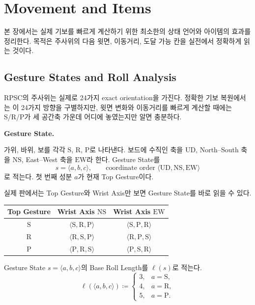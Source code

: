 \chapter{Movement and Items}

본 장에서는 실제 기보를 빠르게 계산하기 위한 최소한의 상태 언어와 아이템의 효과를 정리한다. 목적은 주사위의 다음 윗면, 이동거리, 도달 가능 칸을 실전에서 정확하게 읽는 것이다.

\section{Gesture States and Roll Analysis}

RPSC의 주사위는 실제로 24가지 exact orientation을 가진다. 정확한 기보 복원에서는 이 24가지 방향을 구별하지만, 윗면 변화와 이동거리를 빠르게 계산할 때에는 S/R/P가 세 공간축 가운데 어디에 놓였는지만 알면 충분하다.

\medskip
\noindent\textbf{Gesture State.}

가위, 바위, 보를 각각 $\mathrm{S}$, $\mathrm{R}$, $\mathrm{P}$로 나타낸다. 보드에 수직인 축을 $\mathrm{UD}$, North--South 축을 $\mathrm{NS}$, East--West 축을 $\mathrm{EW}$라 한다. Gesture State를
\[
    s=\langle a,b,c\rangle,
    \qquad
    \text{coordinate order }\langle \mathrm{UD},\mathrm{NS},\mathrm{EW}\rangle
\]
로 적는다. 첫 번째 성분 $a$가 현재 Top Gesture이다.

실제 판에서는 Top Gesture와 Wrist Axis만 보면 Gesture State를 바로 읽을 수 있다.

\begin{center}
    \renewcommand{\arraystretch}{1.16}
    \begin{tabular}{@{}ccc@{}}
        \toprule
        Top Gesture & Wrist Axis $\mathrm{NS}$ & Wrist Axis $\mathrm{EW}$ \\
        \midrule
        $\mathrm{S}$ & $\langle \mathrm{S},\mathrm{R},\mathrm{P}\rangle$ & $\langle \mathrm{S},\mathrm{P},\mathrm{R}\rangle$ \\
        $\mathrm{R}$ & $\langle \mathrm{R},\mathrm{S},\mathrm{P}\rangle$ & $\langle \mathrm{R},\mathrm{P},\mathrm{S}\rangle$ \\
        $\mathrm{P}$ & $\langle \mathrm{P},\mathrm{R},\mathrm{S}\rangle$ & $\langle \mathrm{P},\mathrm{S},\mathrm{R}\rangle$ \\
        \bottomrule
    \end{tabular}
\end{center}

Gesture State $s=\langle a,b,c\rangle$의 Base Roll Length를 $\ell(s)$로 적는다.
\[
    \ell(\langle a,b,c\rangle)\coloneqq
    \begin{cases}
        3,&a=\mathrm{S},\\
        4,&a=\mathrm{R},\\
        5,&a=\mathrm{P}.
    \end{cases}
\]

